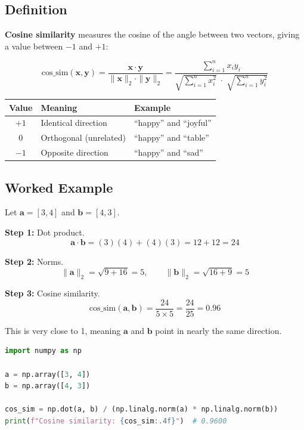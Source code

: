 \documentclass[11pt,a4paper]{article}
\begin{document}
\subsection{Definition}

\textbf{Cosine similarity} measures the cosine of the angle between two vectors, giving a value between $-1$ and $+1$:

\begin{equation}
\boxed{\text{cos\_sim}(\mathbf{x}, \mathbf{y}) = \frac{\mathbf{x} \cdot \mathbf{y}}{\|\mathbf{x}\|_2 \cdot \|\mathbf{y}\|_2} = \frac{\displaystyle\sum_{i=1}^{n} x_i y_i}{\sqrt{\displaystyle\sum_{i=1}^{n} x_i^2} \;\cdot\; \sqrt{\displaystyle\sum_{i=1}^{n} y_i^2}}}
\end{equation}

\begin{center}
\renewcommand{\arraystretch}{1.3}
\begin{tabular}{@{}cll@{}}
\toprule
\textbf{Value} & \textbf{Meaning} & \textbf{Example} \\
\midrule
$+1$ & Identical direction & ``happy'' and ``joyful'' \\
$0$ & Orthogonal (unrelated) & ``happy'' and ``table'' \\
$-1$ & Opposite direction & ``happy'' and ``sad'' \\
\bottomrule
\end{tabular}
\end{center}

\subsection{Worked Example}

Let $\mathbf{a} = [3, 4]$ and $\mathbf{b} = [4, 3]$.

\medskip\noindent\textbf{Step 1:} Dot product.
\[
\mathbf{a} \cdot \mathbf{b} = (3)(4) + (4)(3) = 12 + 12 = 24
\]

\noindent\textbf{Step 2:} Norms.
\[
\|\mathbf{a}\|_2 = \sqrt{9 + 16} = 5, \qquad \|\mathbf{b}\|_2 = \sqrt{16 + 9} = 5
\]

\noindent\textbf{Step 3:} Cosine similarity.
\[
\text{cos\_sim}(\mathbf{a}, \mathbf{b}) = \frac{24}{5 \times 5} = \frac{24}{25} = 0.96
\]

This is very close to 1, meaning $\mathbf{a}$ and $\mathbf{b}$ point in nearly the same direction.

\begin{lstlisting}[language=Python]
import numpy as np

a = np.array([3, 4])
b = np.array([4, 3])

cos_sim = np.dot(a, b) / (np.linalg.norm(a) * np.linalg.norm(b))
print(f"Cosine similarity: {cos_sim:.4f}")  # 0.9600
\end{lstlisting}
\end{document}
